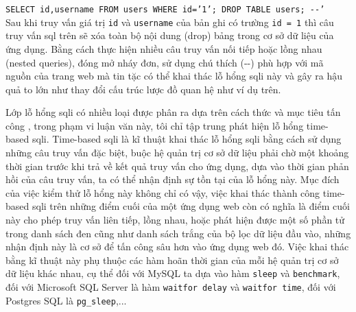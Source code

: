 \colorbox{gray!30}{\texttt{SELECT id,username FROM users WHERE id='1'; DROP TABLE users; -{}-'}}\\
Sau khi truy vấn giá trị \texttt{id} và \texttt{username} của bản ghi có trường \texttt{id = 1} thì câu truy vấn \acrshort{sql} trên sẽ xóa toàn bộ nội dung (drop) bảng  trong cơ sở dữ liệu của ứng dụng. Bằng cách  thực hiện nhiều câu truy vấn nối tiếp hoặc lồng nhau (nested queries), đóng mở nháy đơn, sử dụng chú thích (-{}-) phù hợp với mã nguồn của trang web mà tin tặc có thể khai thác lỗ hổng \acrshort{sqli} này và gây ra hậu quả to lớn như thay đổi cấu trúc lược đồ quan hệ như ví dụ trên.\par
Lớp lỗ hổng \acrshort{sqli} có nhiều loại được phân ra dựa trên cách thức và mục tiêu tấn công \parencite{sqli-classification}, trong phạm vi luận văn này, tôi chỉ tập trung phát hiện lỗ hổng time-based \acrshort{sqli}. Time-based \acrshort{sqli} là kĩ thuật khai thác lỗ hổng \acrshort{sqli} bằng cách sử dụng những câu truy vấn đặc biệt, buộc hệ quản trị cơ sở dữ liệu phải chờ một khoảng thời gian trước khi trả về kết quả truy vấn cho ứng dụng, dựa vào thời gian phản hồi của câu truy vấn, ta có thể nhận định sự tồn tại của lỗ hổng này. Mục đích của việc kiểm thử lỗ hổng này không chỉ có vậy, việc khai thác thành công time-based \acrshort{sqli} trên những điểm cuối của một ứng dụng web còn có nghĩa là điểm cuối này cho phép truy vấn liên tiếp, lồng nhau, hoặc phát hiện được một số phần tử trong danh sách đen cũng như danh sách trắng của bộ lọc dữ liệu đầu vào, những nhận định này là cơ sở để tấn công sâu hơn vào ứng dụng web đó. Việc khai thác bằng kĩ thuật này phụ thuộc các hàm hoãn thời gian của mỗi hệ quản trị cơ sở dữ liệu khác nhau, cụ thể đối với MySQL ta dựa vào hàm \texttt{sleep} và \texttt{benchmark}, đối với Microsoft SQL Server là hàm \texttt{waitfor delay} và \texttt{waitfor time}, đối với Postgres SQL là \texttt{pg\_sleep},...
